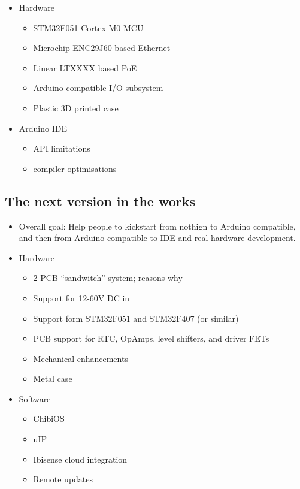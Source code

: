\documentclass[draft,a4paper]{siamltex}
\begin{document}
\begin{itemize}
  \item Hardware
    \begin{itemize}
    \item STM32F051 Cortex-M0 MCU
    \item Microchip ENC29J60 based Ethernet
    \item Linear LTXXXX based PoE
    \item Arduino compatible I/O subsystem
    \item Plastic 3D printed case
    \end{itemize}
  \item Arduino IDE
    \begin{itemize}
    \item API limitations
    \item compiler optimisations
    \end{itemize}
\end{itemize}

\subsection{The next version in the works}


\begin{itemize}
  \item Overall goal: Help people to kickstart from nothign to Arduino
    compatible, and then from Arduino compatible to IDE and real hardware
    development.
  \item Hardware
    \begin{itemize}
    \item 2-PCB ``sandwitch'' system; reasons why
    \item Support for 12-60V DC in
    \item Support form STM32F051 and STM32F407 (or similar)
    \item PCB support for RTC, OpAmps, level shifters, and driver FETs
    \item Mechanical enhancements
    \item Metal case
    \end{itemize}
  \item Software
    \begin{itemize}
    \item ChibiOS
    \item uIP
    \item Ibisense cloud integration
    \item Remote updates
    \end{itemize}
\end{itemize}
\end{document}
